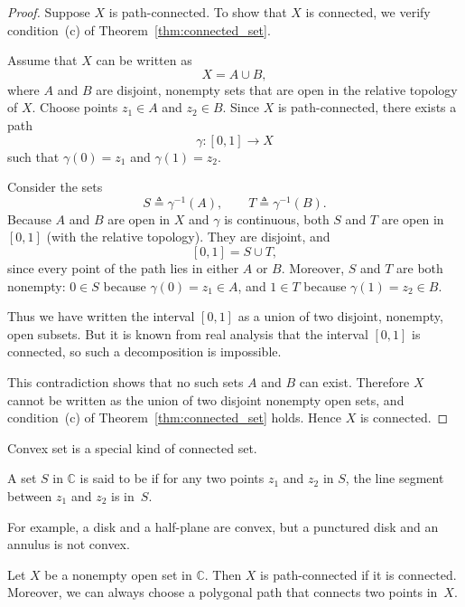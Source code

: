 \begin{proof}
	Suppose $X$ is path-connected. To show that $X$ is connected, we verify condition~(c) of 
	Theorem~\ref{thm:connected_set}.
	
	Assume that $X$ can be written as
	\[
	X = A \cup B,
	\]
	where $A$ and $B$ are disjoint, nonempty sets that are open in the relative topology of $X$.
	Choose points $z_1 \in A$ and $z_2 \in B$. Since $X$ is path-connected, there exists a path
	\[
	\gamma : [0,1] \to X
	\]
	such that $\gamma(0) = z_1$ and $\gamma(1) = z_2$.
	
	Consider the sets
	\[
	S \triangleq \gamma^{-1}(A), \qquad T \triangleq \gamma^{-1}(B).
	\]
	Because $A$ and $B$ are open in $X$ and $\gamma$ is continuous, both $S$ and $T$ are open in
	$[0,1]$ (with the relative topology). They are disjoint, and
	\[
	[0,1] = S \cup T,
	\]
	since every point of the path lies in either $A$ or $B$.	
	Moreover, $S$ and $T$ are both nonempty: $0 \in S$ because $\gamma(0)=z_1\in A$, and
	$1 \in T$ because $\gamma(1)=z_2\in B$.
	
	Thus we have written the interval $[0,1]$ as a union of two disjoint, nonempty, open subsets.
	But it is known from real analysis that the interval $[0,1]$ is connected, so such a
	decomposition is impossible.
	
	This contradiction shows that no such sets $A$ and $B$ can exist. Therefore $X$ cannot be
	written as the union of two disjoint nonempty open sets, and condition~(c) of
	Theorem~\ref{thm:connected_set} holds. Hence $X$ is connected.
\end{proof}

Convex set is a special kind of connected set.

\begin{svgraybox}
	\begin{definition} \label{def:convex_set}
		A set $S$ in $\mathbb{C}$ is said to be  if for any two points $z_1$ and $z_2$ in $S$, the line segment between $z_1$ and $z_2$ is in~$S$.
	\end{definition}
\end{svgraybox}

For example, a disk and a half-plane are convex, but a punctured disk and an annulus is not convex.



\begin{svgraybox}
	\begin{theorem}
Let $X$ be a nonempty open set in $\mathbb{C}$. Then $X$ is path-connected if it is connected. Moreover, we can always choose a polygonal path that connects two points in~$X$.
	\end{theorem}
\end{svgraybox}

